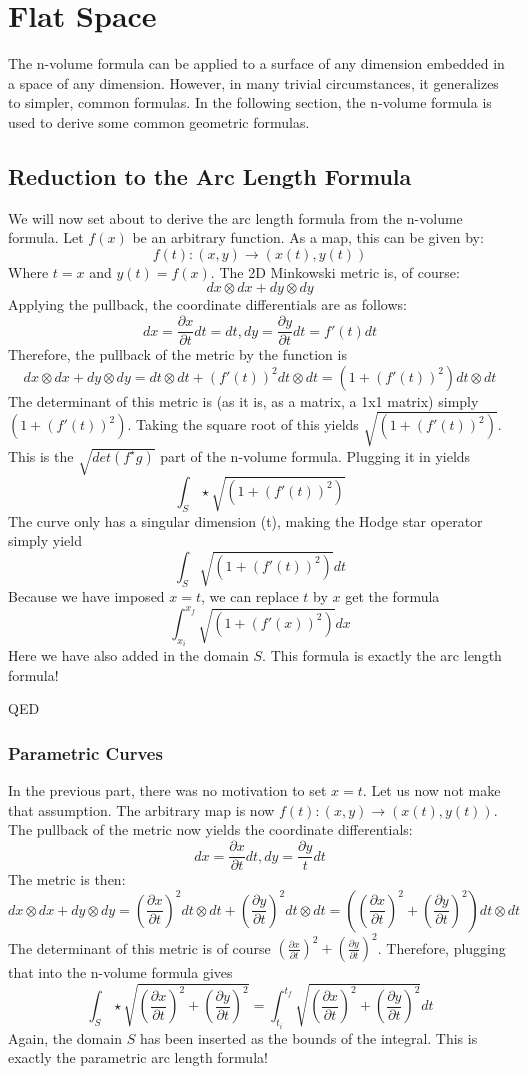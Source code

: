 \documentclass{article}
\begin{document}
\newpage

\section{Flat Space}
The n-volume formula can be applied to a surface of any dimension embedded in a space of any dimension. However, in many trivial circumstances, it generalizes to simpler, common formulas. In the following section, the n-volume formula is used to derive some common geometric formulas.

\subsection{Reduction to the Arc Length Formula}
We will now set about to derive the arc length formula from the n-volume formula. Let $f(x)$ be an arbitrary function. As a map, this can be given by:
\[
f(t):(x,y)\rightarrow(x(t),y(t))
\]
Where $t=x$ and $y(t)=f(x)$. The 2D Minkowski metric is, of course:
\[
dx \otimes dx + dy \otimes dy
\]
Applying the pullback, the coordinate differentials are as follows:
\[
dx = \frac{\partial x}{\partial t} dt = dt, dy = \frac{\partial y}{\partial t} dt = f'(t) dt
\]
Therefore, the pullback of the metric by the function is
\[
dx \otimes dx + dy \otimes dy = dt \otimes dt + (f'(t))^2 dt \otimes dt = (1 + (f'(t))^2) dt \otimes dt
\]
The determinant of this metric is (as it is, as a matrix, a 1x1 matrix) simply $(1 + (f'(t))^2)$. Taking the square root of this yields $\sqrt{(1 + (f'(t))^2)}$. This is the $\sqrt{det(f^{\star}g)}$ part of the n-volume formula. Plugging it in yields
\[
\int_S \star \sqrt{(1 + (f'(t))^2)}
\]
The curve only has a singular dimension (t), making the Hodge star operator simply yield
\[
\int_S \sqrt{(1 + (f'(t))^2)}dt
\]
Because we have imposed $x=t$, we can replace $t$ by $x$ get the formula
\[
\int_{x_i}^{x_f} \sqrt{(1 + (f'(x))^2)}dx
\]
Here we have also added in the domain $S$. This formula is exactly the arc length formula!

QED

\subsubsection{Parametric Curves}
In the previous part, there was no motivation to set $x=t$. Let us now not make that assumption. The arbitrary map is now $f(t):(x,y)\rightarrow(x(t),y(t))$. The pullback of the metric now yields the coordinate differentials:
\[
dx = \frac{\partial x}{\partial t} dt, dy = \frac{\partial y}{t} dt
\]
The metric is then:
\[
dx \otimes dx + dy \otimes dy = (\frac{\partial x}{\partial t})^2 dt \otimes dt + (\frac{\partial y}{\partial t})^2 dt \otimes dt = ((\frac{\partial x}{\partial t})^2 + (\frac{\partial y}{\partial t})^2) dt \otimes dt
\]
The determinant of this metric is of course $(\frac{\partial x}{\partial t})^2 + (\frac{\partial y}{\partial t})^2$. Therefore, plugging that into the n-volume formula gives
\[
\int_S \star \sqrt{(\frac{\partial x}{\partial t})^2 + (\frac{\partial y}{\partial t})^2} = \int_{t_i}^{t_f} \sqrt{(\frac{\partial x}{\partial t})^2 + (\frac{\partial y}{\partial t})^2} dt
\]
Again, the domain $S$ has been inserted as the bounds of the integral. This is exactly the parametric arc length formula!
\end{document}
